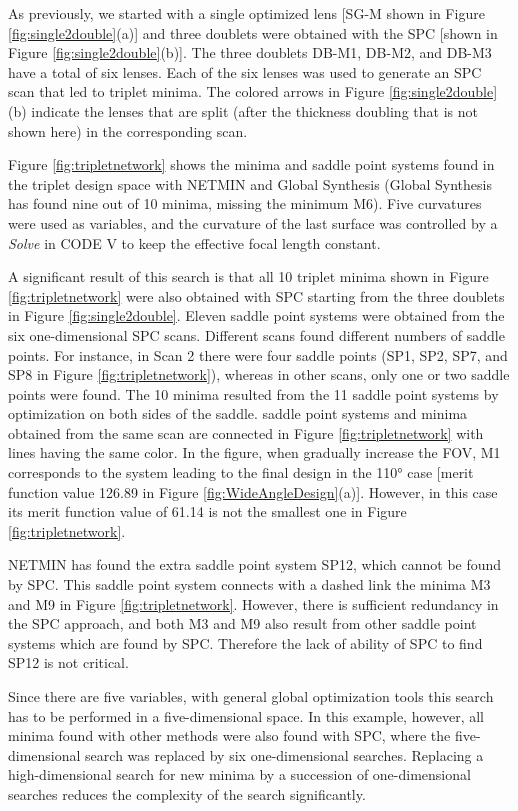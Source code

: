 As previously, we started with a single optimized lens [SG-M shown in Figure \ref{fig:single2double}(a)] and three doublets were obtained with the SPC [shown in Figure \ref{fig:single2double}(b)]. The three doublets DB-M1, DB-M2, and DB-M3 have a total of six lenses.  Each of the six lenses was used to generate an SPC scan that led to triplet minima. The colored arrows in Figure \ref{fig:single2double}(b) indicate the lenses that are split (after the thickness doubling that is not shown here) in the corresponding scan.

Figure \ref{fig:tripletnetwork} shows the minima and saddle point systems found in the triplet design space with NETMIN and Global Synthesis (Global Synthesis has found nine out of 10 minima, missing the minimum M6). Five curvatures were used as variables, and the curvature of the last surface was controlled by a \textit{Solve} in CODE V to keep the effective focal length constant.

A significant result of this search is that all 10 triplet minima shown in Figure \ref{fig:tripletnetwork} were also obtained with SPC starting from the three doublets in Figure \ref{fig:single2double}. Eleven saddle point systems were obtained from the six one-dimensional SPC scans. Different scans found different numbers of saddle points. For instance, in Scan 2 there were four saddle points (SP1, SP2, SP7, and SP8 in Figure \ref{fig:tripletnetwork}), whereas in other scans, only one or two saddle points were found. The 10 minima resulted from the 11 saddle point systems by optimization on both sides of the saddle. saddle point systems and minima obtained from the same scan are connected in Figure \ref{fig:tripletnetwork} with lines having the same color. In the figure, when gradually increase the FOV, M1 corresponds to the system leading to the final design in the 110° case [merit function value 126.89 in Figure \ref{fig:WideAngleDesign}(a)]. However, in this case its merit function value of 61.14 is not the smallest one in Figure \ref{fig:tripletnetwork}.

NETMIN has found the extra saddle point system SP12, which cannot be found by SPC. This saddle point system connects with a dashed link the minima M3 and M9 in Figure \ref{fig:tripletnetwork}. However, there is sufficient redundancy in the SPC approach, and both M3 and M9 also result from other saddle point systems which are found by SPC. Therefore the lack of ability of SPC to find SP12 is not critical.

Since there are five variables, with general global optimization tools this search has to be performed in a five-dimensional space. In this example, however, all minima found with other methods were also found with SPC, where the five-dimensional search was replaced by six one-dimensional searches. Replacing a high-dimensional search for new minima by a succession of one-dimensional searches reduces the complexity of the search significantly.

